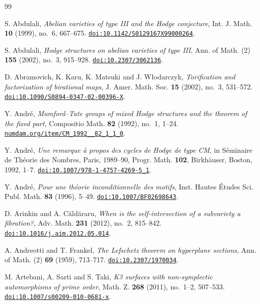 \begin{thebibliography}{99}\raggedright

S. Abdulali,
\emph{Abelian varieties of type III and the Hodge conjecture},
Int. J. Math. \textbf{10} (1999), no.~6, 667--675.
\href{https://doi.org/10.1142/S0129167X99000264}{\nolinkurl{doi:10.1142/S0129167X99000264}}.

S. Abdulali,
\emph{Hodge structures on abelian varieties of type III},
Ann. of Math. (2) \textbf{155} (2002), no.~3, 915--928.
\href{https://doi.org/10.2307/3062136}{\nolinkurl{doi:10.2307/3062136}}.

D. Abramovich, K. Karu, K. Matsuki and J. W\l{}odarczyk,
\emph{Torification and factorization of birational maps},
J. Amer. Math. Soc. \textbf{15} (2002), no.~3, 531--572.
\href{https://doi.org/10.1090/S0894-0347-02-00396-X}{\nolinkurl{doi:10.1090/S0894-0347-02-00396-X}}.

Y. Andr\'e,
\emph{Mumford--Tate groups of mixed Hodge structures and the theorem of the
fixed part},
Compositio Math. \textbf{82} (1992), no.~1, 1--24.
\href{http://www.numdam.org/item/CM_1992__82_1_1_0/}{\nolinkurl{numdam.org/item/CM_1992__82_1_1_0}}.

Y. Andr\'e,
\emph{Une remarque \`a propos des cycles de Hodge de type CM},
in S\'eminaire de Th\'eorie des Nombres, Paris, 1989--90, Progr. Math. \textbf{102}, Birkh\"auser, Boston, 1992, 1--7.
\href{https://doi.org/10.1007/978-1-4757-4269-5_1}{\nolinkurl{doi:10.1007/978-1-4757-4269-5_1}}.

Y. Andr\'e,
\emph{Pour une th\'eorie inconditionnelle des motifs},
Inst. Hautes \'Etudes Sci. Publ. Math. \textbf{83} (1996), 5--49.
\href{https://doi.org/10.1007/BF02698643}{\nolinkurl{doi:10.1007/BF02698643}}.

D. Arinkin and A. C\u{a}ld\u{a}raru,
\emph{When is the self-intersection of a subvariety a fibration?},
Adv. Math. \textbf{231} (2012), no.~2, 815--842.
\href{https://doi.org/10.1016/j.aim.2012.05.014}{\nolinkurl{doi:10.1016/j.aim.2012.05.014}}.

A. Andreotti and T. Frankel,
\emph{The Lefschetz theorem on hyperplane sections},
Ann. of Math. (2) \textbf{69} (1959), 713--717.
\href{https://doi.org/10.2307/1970034}{\nolinkurl{doi:10.2307/1970034}}.

M. Artebani, A. Sarti and S. Taki,
\emph{K3 surfaces with non-symplectic automorphisms of prime order},
Math. Z. \textbf{268} (2011), no.~1--2, 507--533.
\href{https://doi.org/10.1007/s00209-010-0681-x}{\nolinkurl{doi:10.1007/s00209-010-0681-x}}.


\end{thebibliography}
